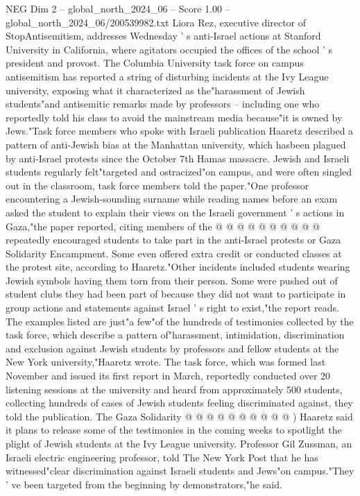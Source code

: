 \begin{textsample}{NEG Dim 2 – global\_north\_2024\_06 – Score 1.00 – global\_north\_2024\_06/200539982.txt}  \label{ex:f2_neg_124}
Liora Rez, executive director of StopAntisemitism, addresses Wednesday ' s anti-Israel actions at Stanford University in California, where agitators occupied the offices of the school ' s president and provost.
The Columbia University task force on campus antisemitism has reported a string of disturbing incidents at the Ivy League university, exposing what it characterized as the"harassment of Jewish students"and antisemitic remarks made by professors -- including one who reportedly told his class to avoid the mainstream media because"it is owned by Jews."Task force members who spoke with Israeli publication Haaretz described a pattern of anti-Jewish bias at the Manhattan university, which hasbeen plagued by anti-Israel protests since the October 7th Hamas massacre.
Jewish and Israeli students regularly felt"targeted and ostracized"on campus, and were often singled out in the classroom, task force members told the paper."One professor encountering a Jewish-sounding surname while reading names before an exam asked the student to explain their views on the Israeli government ' s actions in Gaza,"the paper reported, citing members of the @ @ @ @ @ @ @ @ @ @ repeatedly encouraged students to take part in the anti-Israel protests or Gaza Solidarity Encampment.
Some even offered extra credit or conducted classes at the protest site, according to Haaretz."Other incidents included students wearing Jewish symbols having them torn from their person.
Some were pushed out of student clubs they had been part of because they did not want to participate in group actions and statements against Israel ' s right to exist,"the report reads.
The examples listed are just"a few"of the hundreds of testimonies collected by the task force, which describe a pattern of"harassment, intimidation, discrimination and exclusion against Jewish students by professors and fellow students at the New York university,"Haaretz wrote.
The task force, which was formed last November and issued its first report in March, reportedly conducted over 20 listening sessions at the university and heard from approximately 500 students, collecting hundreds of cases of Jewish students feeling discriminated against, they told the publication.
The Gaza Solidarity @ @ @ @ @ @ @ @ @ @ ) Haaretz said it plans to release some of the testimonies in the coming weeks to spotlight the plight of Jewish students at the Ivy League university.
Professor Gil Zussman, an Israeli electric engineering professor, told The New York Post that he has witnessed"clear discrimination against Israeli students and Jews"on campus."They ' ve been targeted from the beginning by demonstrators,"he said.

\end{textsample}
